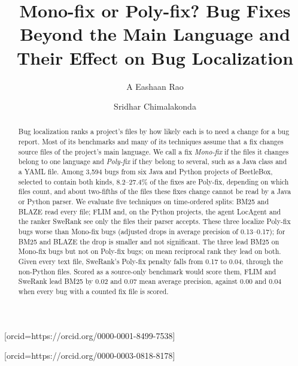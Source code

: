 \documentclass[a4paper,fleqn]{cas-dc}
\begin{document}
\let\WriteBookmarks\relax
\def\floatpagepagefraction{1}
\def\textpagefraction{.001}


\title[]{Mono-fix or Poly-fix? Bug Fixes Beyond the Main Language and Their Effect on Bug Localization}

\author[1]{A Eashaan Rao}[orcid=https://orcid.org/0000-0001-8499-7538]
\cormark[1]

\author[1]{Sridhar Chimalakonda}[orcid=https://orcid.org/0000-0003-0818-8178]



\begin{abstract}
Bug localization ranks a project's files by how likely each is to need a
change for a bug report. Most of its benchmarks and many of its techniques
assume that a fix changes source files of the project's main language. We call
a fix \emph{Mono-fix} if the files it changes belong to one language and
\emph{Poly-fix} if they belong to several, such as a Java class and a YAML
file. Among 3{,}594 bugs from six Java and Python projects of BeetleBox,
selected to contain both kinds, 8.2--27.4\% of the fixes are Poly-fix,
depending on which files count, and about two-fifths of the files these fixes
change cannot be read by a Java or Python parser. We evaluate five techniques
on time-ordered splits: BM25 and BLAZE read every file; FLIM and, on the
Python projects, the agent LocAgent and the ranker SweRank see only the files
their parser accepts. These three localize Poly-fix bugs worse than Mono-fix
bugs (adjusted drops in average precision of 0.13--0.17); for BM25 and BLAZE
the drop is smaller and not significant. The three lead BM25 on Mono-fix bugs
but not on Poly-fix bugs; on mean reciprocal rank they lead on both. Given every text
file, SweRank's Poly-fix penalty falls from 0.17 to 0.04, through the
non-Python files. Scored as a source-only benchmark would score them, FLIM and
SweRank lead BM25 by 0.02 and 0.07 mean average precision, against 0.00 and
0.04 when every bug with a counted fix file is scored.
\end{abstract}
\end{document}
